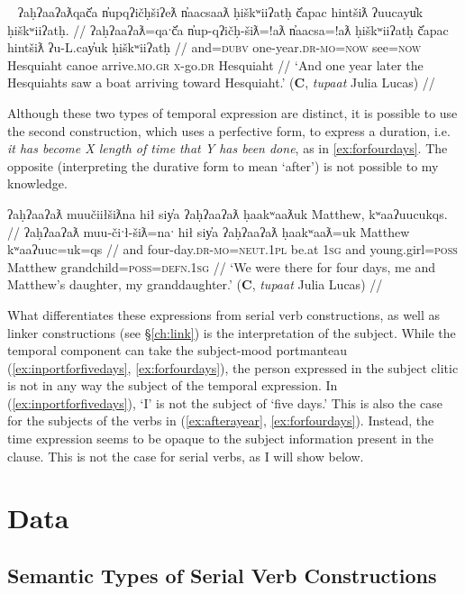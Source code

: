 \ex~ \label{ex:afterayear}
\begingl
\glpreamble ʔaḥʔaaʔaƛqač̓a n̓upqʔičḥšiʔeƛ n̓aacsaaƛ ḥiškʷiiʔatḥ č̓apac hintšiƛ ʔuucayu̓k ḥiškʷiiʔatḥ. //
\gla ʔaḥʔaaʔaƛ=qaˑč̓a n̓up-qʔičḥ-šiƛ=!aƛ n̓aacsa=!aƛ ḥiškʷiiʔatḥ č̓apac hintšiƛ ʔu-L.cay̓uk ḥiškʷiiʔatḥ //
\glb and=\textsc{dubv} one-year.\textsc{dr}-\textsc{mo}=\textsc{now} see=\textsc{now} Hesquiaht canoe arrive.\textsc{mo}.\textsc{gr} \textsc{x}-go.\textsc{dr} Hesquiaht //
\glft `And one year later the Hesquiahts saw a boat arriving toward Hesquiaht.' (\textbf{C}, \textit{tupaat} Julia Lucas) //
\endgl
\xe

Although these two types of temporal expression are distinct, it is possible to use the second construction, which uses a perfective form, to express a duration, i.e. \textit{it has become X length of time that Y has been done}, as in \ref{ex:forfourdays}. The opposite (interpreting the durative form to mean `after') is not possible to my knowledge.

\ex \label{ex:forfourdays}
\begingl
\glpreamble ʔaḥʔaaʔaƛ muučiiłšiƛna hił siy̓a ʔaḥʔaaʔaƛ ḥaakʷaaƛuk Matthew, kʷaaʔuucukqs. //
\gla ʔaḥʔaaʔaƛ muu-čiˑł-šiƛ=naˑ hił siy̓a ʔaḥʔaaʔaƛ ḥaakʷaaƛ=uk Matthew kʷaaʔuuc=uk=qs //
\glb and four-day.\textsc{dr}-\textsc{mo}=\textsc{neut.1pl} be.at \textsc{1sg} and young.girl=\textsc{poss} Matthew grandchild=\textsc{poss}=\textsc{defn.1sg} //
\glft `We were there for four days, me and Matthew's daughter, my granddaughter.' (\textbf{C}, \textit{tupaat} Julia Lucas) //
\endgl
\xe

What differentiates these expressions from serial verb constructions, as well as linker constructions (see \S\ref{ch:link}) is the interpretation of the subject. While the temporal component can take the subject-mood portmanteau (\ref{ex:inportforfivedays}, \ref{ex:forfourdays}), the person expressed in the subject clitic is not in any way the subject of the temporal expression. In (\ref{ex:inportforfivedays}), `I' is not the subject of `five days.' This is also the case for the subjects of the verbs in (\ref{ex:afterayear}, \ref{ex:forfourdays}). Instead, the time expression seems to be opaque to the subject information present in the clause. This is not the case for serial verbs, as I will show below.

\section{Data} \label{ch:sv:data}

\subsection{Semantic Types of Serial Verb Constructions}

